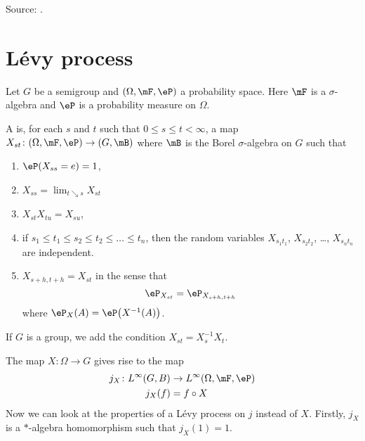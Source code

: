 Source: \cite{UweLevy}.

\section{Lévy process}

Let $G$ be a semigroup and $(\Omega,\mF,\eP)$ a probability space. Here $\mF$ is a $\sigma$-algebra and $\eP$ is a probability measure on $\Omega$.
\begin{definition}
    A  is, for each $s$ and $t$ such that $0\leq s\leq t<\infty$, a map $X_{st}\colon (\Omega,\mF,\eP)\to (G,\mB)$ where $\mB$ is the Borel $\sigma$-algebra on $G$ such that
    \begin{enumerate}
        \item
            $\eP(X_{ss}=e)=1$,
        \item
            $X_{ss}=\lim_{t\searrow s}X_{st}$
        \item
            $X_{st}X_{tu}=X_{su}$,
        \item
            if $s_1\leq t_1\leq s_2\leq t_2\leq \ldots\leq t_n$, then the random variables $X_{s_1t_1}$, $X_{s_2t_2}$, \ldots, $X_{s_nt_n}$ are independent.
        \item
            $X_{s+h,t+h}=X_{st}$ in the sense that
            \begin{equation}
                \eP_{X_{st}}=\eP_{X_{s+h,t+h}}
            \end{equation}
            where $\eP_X(A)=\eP\big( X^{-1}(A) \big)$.
    \end{enumerate}
    If $G$ is a group, we add the condition $X_{st}=X_s^{-1}X_t$.
\end{definition}

The map $X\colon \Omega\to G$ gives rise to the map
\begin{equation}
    \begin{aligned}
        j_X\colon L^{\infty}(G,B)&\to L^{\infty}(\Omega,\mF,\eP) \\
        j_X(f)&=f\circ X
    \end{aligned}
\end{equation}
Now we can look at the properties of a Lévy process on $j$ instead of $X$. Firstly, $j_X$ is a $*$-algebra homomorphism such that $j_X(1)=1$.

